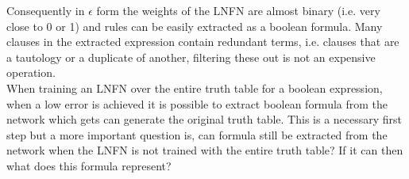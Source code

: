 Consequently in $\epsilon$ form the weights of the LNFN are almost binary (i.e. very close to 0 or 1) and rules can be easily extracted as a boolean formula. Many clauses in the extracted expression contain redundant terms, i.e. clauses that are a tautology or a duplicate of another, filtering these out is not an expensive operation.\\

When training an LNFN over the entire truth table for a boolean expression, when a low error is achieved it is possible to extract boolean formula from the network which gets can generate the original truth table. This is a necessary first step but a more important question is, can formula still be extracted from the network when the LNFN is not trained with the entire truth table? If it can then what does this formula represent?
